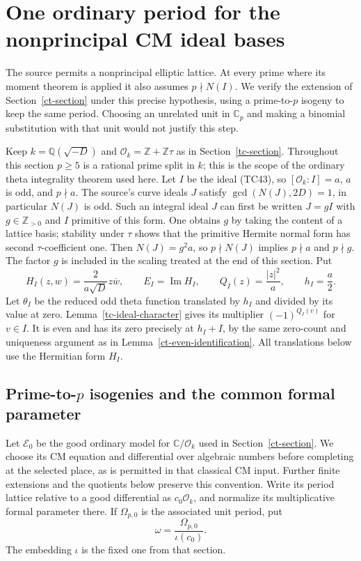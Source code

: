 \section{One ordinary period for the nonprincipal CM ideal bases}
\label{ci-section}

The source permits a nonprincipal elliptic lattice.  At every
prime where its moment theorem is applied it also assumes
$p\nmid N(I)$.  We verify the extension of
Section~\ref{ct-section} under this precise hypothesis, using a
prime-to-$p$ isogeny to keep the same period.  Choosing an unrelated
unit in $\mathbb C_p$ and making a binomial substitution with that
unit would not justify this step.

Keep $k=\mathbb Q(\sqrt{-D})$ and
$\mathcal O_k=\mathbb Z+\mathbb Z\tau$ as in
Section~\ref{tc-section}.  Throughout this section $p\geq5$
is a rational prime split in $k$; this is the scope of the
ordinary theta integrality theorem used here.
Let $I$ be the ideal (TC43),
so $[\mathcal O_k:I]=a$, $a$ is odd, and $p\nmid a$.
The source's curve ideals $J$ satisfy
$\gcd(N(J),2D)=1$, in particular $N(J)$ is odd.
Such an integral ideal $J$ can
first be written $J=gI$ with $g\in\mathbb Z_{>0}$ and
$I$ primitive of this form.  One obtains $g$ by taking the
content of a lattice basis; stability under $\tau$ shows
that the primitive Hermite normal form has second
$\tau$-coefficient one.
Then $N(J)=g^2a$, so $p\nmid N(J)$ implies $p\nmid a$
and $p\nmid g$.  The factor $g$ is included in the
scaling treated at the end of this section.
Put
\[
 H_I(z,w)=\frac{2}{a\sqrt D}z\overline w,\qquad
 E_I=\operatorname{Im}H_I,\qquad
 Q_I(z)=\frac{|z|^2}{a},\qquad h_I=\frac a2.
 \tag{CI1}
\]
Let $\theta_I$ be the reduced odd theta function translated
by $h_I$ and divided by its value at zero.  Lemma~\ref{tc-ideal-character}
gives its multiplier $(-1)^{Q_I(v)}$ for $v\in I$.
It is even and has its zero precisely at $h_I+I$, by the
same zero-count and uniqueness argument as in
Lemma~\ref{ct-even-identification}.  All translations below use
the Hermitian form $H_I$.

\subsection{Prime-to-$p$ isogenies and the common formal parameter}

Let $\mathscr E_0$ be the good ordinary model for
$\mathbb C/\mathcal O_k$ used in Section~\ref{ct-section}.
We choose its CM equation and differential over algebraic
numbers before completing at the selected place, as is
permitted in that classical CM input.  Further finite
extensions and the quotients below preserve this convention.
Write its period lattice relative to a good differential as
$c_0\mathcal O_k$, and normalize its multiplicative formal
parameter there.  If $\Omega_{p,0}$ is the associated unit
period, put
\[
                  \omega=\frac{\Omega_{p,0}}{\iota(c_0)}.
 \tag{CI2}
\]
The embedding $\iota$ is the fixed one from that section.

